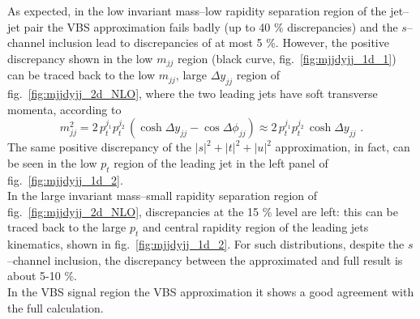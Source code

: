 As expected, in the low invariant mass--low rapidity separation region of the jet--jet pair the VBS approximation fails badly (up to 40 \% discrepancies) and the $s$--channel inclusion lead to discrepancies of at most 5 \%. However, the positive discrepancy shown in the low $m_{jj}$ region (black curve, fig.~\ref{fig:mjjdyjj_1d_1}) can be traced back to the low $m_{jj}$, large $\Delta y_{jj}$ region of fig.~\ref{fig:mjjdyjj_2d_NLO}, where the two leading jets have soft transverse momenta, according to
\[
m_{jj}^2 = 2\,p_t^{j_1}p_t^{j_2}\,(\cosh \Delta y_{jj} - \cos \Delta\phi_{jj}) \approx 2\,p_t^{j_1}p_t^{j_2}\,\cosh \Delta y_{jj} \,\,.
\]
The same positive discrepancy of the $|s|^2 + |t|^2 + |u|^2$ approximation, in fact, can be seen in the low $p_t$ region of the leading jet in the left panel of fig.~\ref{fig:mjjdyjj_1d_2}.\\
In the large invariant mass--small rapidity separation region of fig.~\ref{fig:mjjdyjj_2d_NLO}, discrepancies at the 15 \% level are left: this can be traced back to the large $p_t$ and central rapidity region of the leading jets kinematics, shown in fig.~\ref{fig:mjjdyjj_1d_2}. For such distributions, despite the $s$--channel inclusion, the discrepancy between the approximated and full result is about 5-10 \%.\\
In the VBS signal region the VBS approximation it shows a good agreement with the full calculation.

